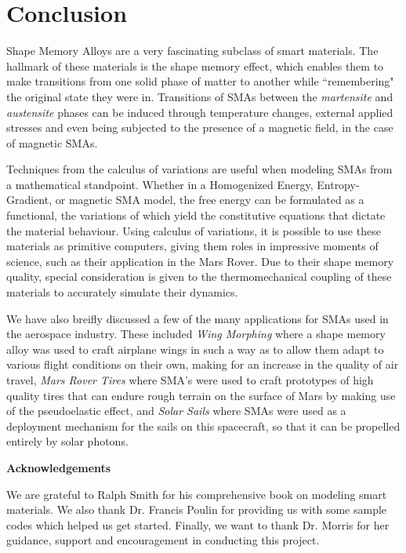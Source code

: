 \newenvironment{acknowledgement}%
    {\large\bfseries Acknowledgements%
    \par\medskip\normalfont\normalsize}%
    {}%
\chapter{Conclusion}
\begin{multicols}{2}

Shape Memory Alloys are a very fascinating subclass of smart materials. The hallmark of these materials is the shape memory effect, which enables them to make transitions from one solid phase of matter to another while ``remembering" the original state they were in. Transitions of SMAs between the \textit{martensite} and \textit{austensite} phases can be induced through temperature changes, external applied stresses and even being subjected to the presence of a magnetic field, in the case of magnetic SMAs. 

Techniques from the calculus of variations are useful when modeling SMAs from a mathematical standpoint. Whether in a Homogenized Energy, Entropy-Gradient, or magnetic SMA model, the free energy can be formulated as a functional, the variations of which yield the constitutive equations that dictate the material behaviour. Using calculus of variations, it is possible to use these materials as primitive computers, giving them roles in impressive moments of science, such as their application in the Mars Rover.  Due to their shape memory quality, special consideration is given to the thermomechanical coupling of these materials to accurately simulate their dynamics.

We have also breifly discussed a few of the many applications for SMAs used in the aerospace industry. These included \textit{Wing Morphing} where a shape memory alloy was used to craft airplane wings in such a way as to allow them adapt to various flight conditions on their own, making for an increase in the quality of air travel, \textit{Mars Rover Tires} where SMA's were used to craft prototypes of high quality tires that can endure rough terrain on the surface of Mars by making use of the pseudoelastic effect, and \textit{Solar Sails} where SMAs were used as a deployment mechanism for the sails on this spacecraft, so that it can be propelled entirely by solar photons.
 












\begin{acknowledgement}
We are grateful to Ralph Smith for his comprehensive book on modeling smart materials. We also thank Dr. Francis Poulin for providing us with some sample codes which helped us get started. Finally, we want to thank Dr. Morris for her guidance, support and encouragement in conducting this project. 
\end{acknowledgement}
\end{multicols}








